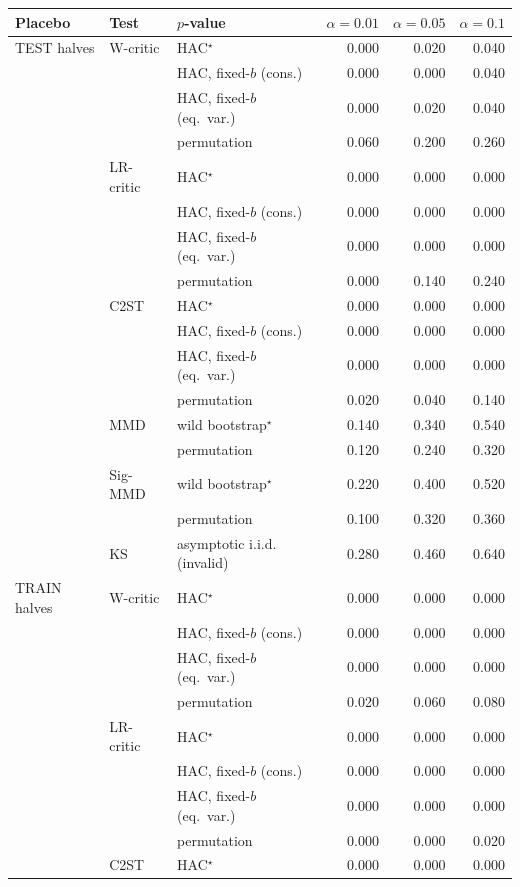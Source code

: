 \begin{tabular}{lllrrr}
\toprule
Placebo & Test & $p$-value & $\alpha=0.01$ & $\alpha=0.05$ & $\alpha=0.1$ \\
\midrule
TEST halves & W-critic & HAC$^{\star}$ & 0.000 & 0.020 & 0.040 \\
 &  & HAC, fixed-$b$ (cons.) & 0.000 & 0.000 & 0.040 \\
 &  & HAC, fixed-$b$ (eq.\ var.) & 0.000 & 0.020 & 0.040 \\
 &  & permutation & 0.060 & 0.200 & 0.260 \\
 & LR-critic & HAC$^{\star}$ & 0.000 & 0.000 & 0.000 \\
 &  & HAC, fixed-$b$ (cons.) & 0.000 & 0.000 & 0.000 \\
 &  & HAC, fixed-$b$ (eq.\ var.) & 0.000 & 0.000 & 0.000 \\
 &  & permutation & 0.000 & 0.140 & 0.240 \\
 & C2ST & HAC$^{\star}$ & 0.000 & 0.000 & 0.000 \\
 &  & HAC, fixed-$b$ (cons.) & 0.000 & 0.000 & 0.000 \\
 &  & HAC, fixed-$b$ (eq.\ var.) & 0.000 & 0.000 & 0.000 \\
 &  & permutation & 0.020 & 0.040 & 0.140 \\
 & MMD & wild bootstrap$^{\star}$ & 0.140 & 0.340 & 0.540 \\
 &  & permutation & 0.120 & 0.240 & 0.320 \\
 & Sig-MMD & wild bootstrap$^{\star}$ & 0.220 & 0.400 & 0.520 \\
 &  & permutation & 0.100 & 0.320 & 0.360 \\
 & KS & asymptotic i.i.d. (invalid) & 0.280 & 0.460 & 0.640 \\
TRAIN halves & W-critic & HAC$^{\star}$ & 0.000 & 0.000 & 0.000 \\
 &  & HAC, fixed-$b$ (cons.) & 0.000 & 0.000 & 0.000 \\
 &  & HAC, fixed-$b$ (eq.\ var.) & 0.000 & 0.000 & 0.000 \\
 &  & permutation & 0.020 & 0.060 & 0.080 \\
 & LR-critic & HAC$^{\star}$ & 0.000 & 0.000 & 0.000 \\
 &  & HAC, fixed-$b$ (cons.) & 0.000 & 0.000 & 0.000 \\
 &  & HAC, fixed-$b$ (eq.\ var.) & 0.000 & 0.000 & 0.000 \\
 &  & permutation & 0.000 & 0.000 & 0.020 \\
 & C2ST & HAC$^{\star}$ & 0.000 & 0.000 & 0.000 \\

\end{tabular}
